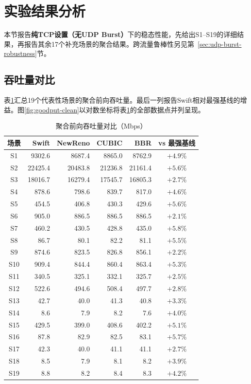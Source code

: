 \section{实验结果分析}
\label{sec:results-analysis}

本节报告\textbf{纯TCP设置（无UDP Burst）}下的稳态性能，先给出S1--S19的详细结果，再报告其余17个补充场景的聚合结果。跨流量鲁棒性另见第~\ref{sec:udp-burst-robustness}节。

\subsection{吞吐量对比}

表\ref{tab:throughput_summary}汇总19个代表性场景的聚合前向吞吐量。最后一列报告Swift相对最强基线的增益。图\ref{fig:goodput-clean}以对数坐标将表\ref{tab:throughput_summary}的全部数据点并列呈现。

\begin{table}[htbp]
\centering
\caption{聚合前向吞吐量对比（Mbps）}
\label{tab:throughput_summary}
\small
\begin{tabular}{|c|r|r|r|r|c|}
\hline
\textbf{场景} & \textbf{Swift} & \textbf{NewReno} & \textbf{CUBIC} & \textbf{BBR} & \textbf{vs 最强基线} \\
\hline
S1 & 9302.6 & 8687.4 & 8865.0 & 8762.9 & $+4.9$\% \\
S2 & 22425.4 & 20483.8 & 21236.8 & 21161.4 & $+5.6$\% \\
S3 & 18016.7 & 16279.4 & 17545.7 & 16805.3 & $+2.7$\% \\
S4 & 878.6 & 798.6 & 839.7 & 817.0 & $+4.6$\% \\
S5 & 454.5 & 406.8 & 430.3 & 429.6 & $+5.6$\% \\
S6 & 905.0 & 886.5 & 886.5 & 886.5 & $+2.1$\% \\
S7 & 460.2 & 430.5 & 428.8 & 435.0 & $+5.8$\% \\
S8 & 86.7 & 80.1 & 82.2 & 81.1 & $+5.5$\% \\
S9 & 874.6 & 823.5 & 826.8 & 856.1 & $+2.2$\% \\
S10 & 909.4 & 844.4 & 860.4 & 863.4 & $+5.3$\% \\
S11 & 340.5 & 325.1 & 332.1 & 325.7 & $+2.5$\% \\
S12 & 522.6 & 494.6 & 508.4 & 497.7 & $+2.8$\% \\
S13 & 42.7 & 40.0 & 41.3 & 40.8 & $+3.3$\% \\
S14 & 8.6 & 7.9 & 8.2 & 7.6 & $+4.0$\% \\
S15 & 429.5 & 399.0 & 408.6 & 402.2 & $+5.1$\% \\
S16 & 87.8 & 82.9 & 82.5 & 83.1 & $+5.7$\% \\
S17 & 42.3 & 40.0 & 41.1 & 41.1 & $+2.7$\% \\
S18 & 8.5 & 7.9 & 8.1 & 8.2 & $+3.9$\% \\
S19 & 8.8 & 8.2 & 8.4 & 8.3 & $+4.2$\% \\
\hline
\end{tabular}
\end{table}

